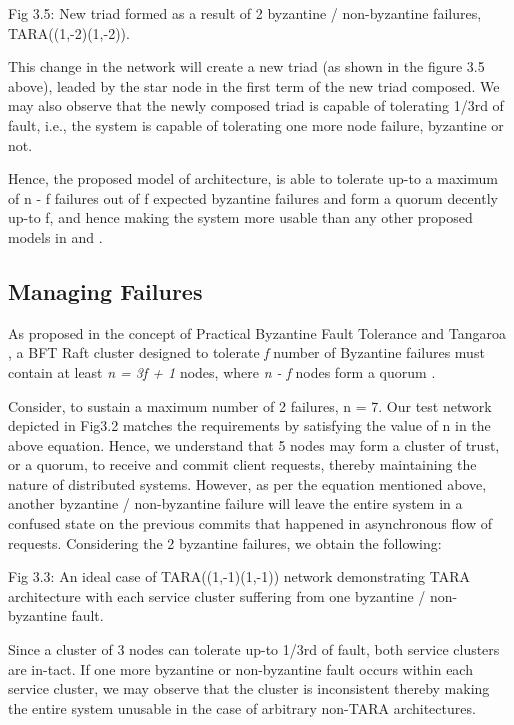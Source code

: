 \documentclass[]{article}
\begin{document}
Fig 3.5: New triad formed as a result of 2 byzantine / non-byzantine failures, TARA((1,-2)(1,-2)).

This change in the network will create a new triad (as shown in the figure 3.5 above), leaded by the star node in the first term of the new triad composed. We may also observe that the newly composed triad is capable of tolerating 1/3rd of fault, i.e., the system is capable of tolerating one more node failure, byzantine or not.

Hence, the proposed model of architecture, is able to tolerate up-to a maximum of n - f failures out of f expected byzantine failures and form a quorum decently up-to f, and hence making the system more usable than any other proposed models in \cite{ARTICLE:1} and \cite{ARTICLE:3}.

\subsection{Managing Failures}

As proposed in the concept of Practical Byzantine Fault Tolerance \cite{ARTICLE:1} and Tangaroa \cite{ARTICLE:3} , a BFT Raft cluster designed to tolerate \textit{f} number of Byzantine failures must contain at least \textit{n = 3f + 1} nodes, where \textit{n - f} nodes form a quorum \cite{ARTICLE:3}.

Consider, to sustain a maximum number of 2 failures, n = 7. Our test network depicted in Fig3.2 matches the requirements by satisfying the value of n in the above equation. Hence, we understand that 5 nodes may form a cluster of trust, or a quorum, to receive and commit client requests, thereby maintaining the nature of distributed systems. However, as per the equation mentioned above, another byzantine / non-byzantine failure will leave the entire system in a confused state on the previous commits that happened in asynchronous flow of requests.
Considering the 2 byzantine failures, we obtain the following:

Fig 3.3: An ideal case of TARA((1,-1)(1,-1)) network demonstrating TARA architecture with each service cluster suffering from one byzantine / non-byzantine fault.

Since a cluster of 3 nodes can tolerate up-to 1/3rd of fault, both service clusters are in-tact. If one more byzantine or non-byzantine fault occurs within each service cluster, we may observe that the cluster is inconsistent thereby making the entire system unusable in the case of arbitrary non-TARA architectures.
\end{document}
